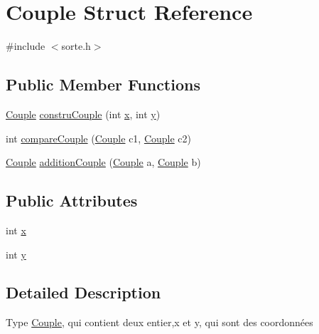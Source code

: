 \hypertarget{structCouple}{
\section{Couple Struct Reference}
\label{structCouple}
}


{\ttfamily \#include $<$sorte.h$>$}

\subsection*{Public Member Functions}
\begin{DoxyCompactItemize}
\item 
\hyperlink{structCouple}{Couple} \hyperlink{structCouple_ae37b71c317208e90582f69114caf331a}{construCouple} (int \hyperlink{structCouple_ad26b1b2b38e272d15d513642cf158a74}{x}, int \hyperlink{structCouple_a38b6e923a0b1c97433ccb9251f2006fa}{y})
\item 
int \hyperlink{structCouple_a58cd923bfb74db84d797e6cb9a6db782}{compareCouple} (\hyperlink{structCouple}{Couple} c1, \hyperlink{structCouple}{Couple} c2)
\item 
\hyperlink{structCouple}{Couple} \hyperlink{structCouple_ad3ca5cb6745db3c4c004acf56c1abd82}{additionCouple} (\hyperlink{structCouple}{Couple} a, \hyperlink{structCouple}{Couple} b)
\end{DoxyCompactItemize}
\subsection*{Public Attributes}
\begin{DoxyCompactItemize}
\item 
int \hyperlink{structCouple_ad26b1b2b38e272d15d513642cf158a74}{x}
\item 
int \hyperlink{structCouple_a38b6e923a0b1c97433ccb9251f2006fa}{y}
\end{DoxyCompactItemize}


\subsection{Detailed Description}
Type \hyperlink{structCouple}{Couple}, qui contient deux entier,x et y, qui sont des coordonnées 


